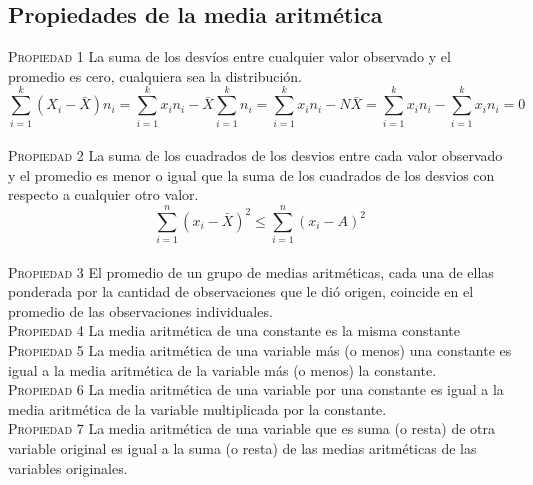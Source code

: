 \documentclass[10pt,a4paper]{article}
\begin{document}
\subsection{Propiedades de la media aritmética}
\textsc{Propiedad 1} La suma de los desvíos entre cualquier valor observado y el promedio es cero, cualquiera sea la distribución.
\begin{equation}
	\sum_{i=1}^{k}(X_i-\bar{X})n_i=\sum_{i=1}^{k}x_i n_i-\bar{X}\sum_{i=1}^{k}n_i=\sum_{i=1}^{k}x_i n_i-N\bar{X}=\sum_{i=1}^{k}x_i n_i-\sum_{i=1}^{k}x_i n_i=0
\end{equation}
\\
\textsc{Propiedad 2} La suma de los cuadrados de los desvios entre cada valor observado y el promedio es menor o igual que la suma de los cuadrados de los desvios con respecto a cualquier otro valor.
\begin{equation}
	\sum_{i=1}^{n}(x_i-\bar{X})^2\leq \sum_{i=1}^{n}(x_i-A)^2
\end{equation}\\
\textsc{Propiedad 3} El promedio de un grupo de medias aritméticas, cada una de ellas ponderada por la cantidad de observaciones que le dió origen, coincide en el promedio de las observaciones individuales.\\
\textsc{Propiedad 4} La media aritmética de una constante es la misma constante\\
\textsc{Propiedad 5} La media aritmética de una variable más (o menos) una constante es igual a la media aritmética de la variable más (o menos) la constante.\\
\textsc{Propiedad 6} La media aritmética de una variable por una constante es igual a la media aritmética de la variable multiplicada por la constante.\\
\textsc{Propiedad 7} La media aritmética de una variable que es suma (o resta) de otra variable original es igual a la suma (o resta) de las medias aritméticas de las variables originales.\\
\end{document}
